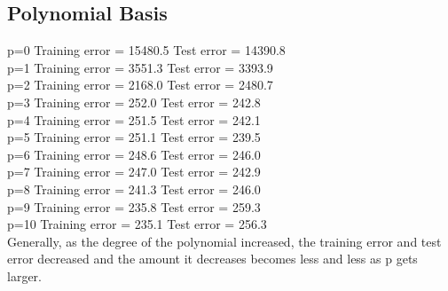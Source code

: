 \documentclass{article}
\begin{document}
\subsection{Polynomial Basis}
p=0
Training error = 15480.5
Test error     = 14390.8\\
p=1
Training error = 3551.3
Test error     = 3393.9\\
p=2
Training error = 2168.0
Test error     = 2480.7\\
p=3
Training error = 252.0
Test error     = 242.8\\
p=4
Training error = 251.5
Test error     = 242.1\\
p=5
Training error = 251.1
Test error     = 239.5\\
p=6
Training error = 248.6
Test error     = 246.0\\
p=7
Training error = 247.0
Test error     = 242.9\\
p=8
Training error = 241.3
Test error     = 246.0\\
p=9
Training error = 235.8
Test error     = 259.3\\
p=10
Training error = 235.1
Test error     = 256.3\\
Generally, as the degree of the polynomial increased, the training error and test error decreased and the amount
it decreases becomes less and less as p gets larger.
\end{document}
